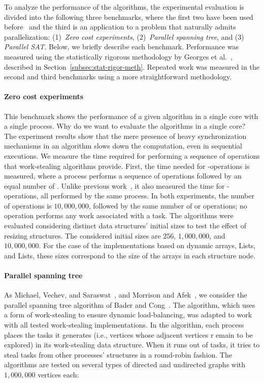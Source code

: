 To analyze the performance of the algorithms, the experimental evaluation is divided into the following three benchmarks, where the first two have been used before~\cite{DBLP_conf_pldi_FrigoLR98, maged.vechev.2009, fencefreework} and the third is an application to a problem that naturally admits parallelization: (1)~\textit{Zero cost experiments}, (2)~\textit{Parallel spanning tree}, and (3) \textit{Parallel SAT}. Below, we briefly describe each benchmark.  Performance was measured using the statistically rigorous methodology by Georges et al.~\cite{DBLP_conf_oopsla_GeorgesBE07}, described in Section~\ref{subsec:stat-rigor-meth}.  Repeated work was measured in the second and third benchmarks using a more straightforward methodology.

\paragraph*{Zero cost experiments\label{zero-cost-experiment}}

This benchmark shows the performance of a given algorithm in a single core with a single process. Why do we want to evaluate the algorithms in a single core? The experiment results show that the mere presence of heavy synchronization mechanisms in an algorithm slows down the computation, even in sequential executions. We measure the time required for performing a sequence of operations that work-stealing algorithms provide. First, the time needed for \Put-\Take operations is measured, where a process performs a sequence of \Put operations followed by an equal number of \Takes. Unlike previous work~\cite{maged.vechev.2009, fencefreework}, it also measured the time for \Put-\Steal operations, all performed by the same process. In both experiments, the number of \Put operations is \(10,000,000\), followed by the same number of \Take or \Steal operations; no operation performs any work associated with a task. The algorithms were evaluated considering distinct data structures' initial sizes to test the effect of resizing structures. The considered initial sizes are \(256\), \(1,000,000\), and \(10,000,000\).  For the case of the implementations based on dynamic arrays, \NCWSM Lists, and \BNCWSM Lists, these sizes correspond to the size of the arrays in each structure node.

\paragraph*{Parallel spanning tree\label{irregular-graph}}
As Michael, Vechev, and Saraswat~\cite{maged.vechev.2009}, and Morrison and Afek~\cite{fencefreework}, we consider the parallel spanning tree algorithm of Bader and Cong~\cite{1302951}. The algorithm, which uses a form of work-stealing to ensure dynamic load-balancing, was adapted to work with all tested work-stealing implementations. In the algorithm, each process places the tasks it generates (i.e., vertices whose adjacent vertices r
emain to be explored) in its work-stealing data structure. When it runs out of tasks, it tries to steal tasks from other processes' structures in a round-robin fashion. The algorithms are tested on several types of directed and undirected graphs with $1,000,000$ vertices each:

